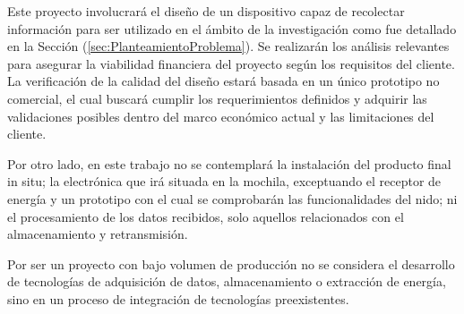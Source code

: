 Este proyecto involucrará el diseño de un dispositivo capaz de recolectar información para ser utilizado en el ámbito de la investigación como fue detallado en la Sección (\ref{sec:PlanteamientoProblema}). Se realizarán los análisis relevantes para asegurar la viabilidad financiera del proyecto según los requisitos del cliente. La verificación de la calidad del diseño estará basada en un único prototipo no comercial, el cual buscará cumplir los requerimientos definidos y adquirir las validaciones posibles dentro del marco económico actual y las limitaciones del cliente. 

Por otro lado, en este trabajo no se contemplará la instalación del producto final in situ; la electrónica que irá situada en la mochila, exceptuando el receptor de energía y un prototipo con el cual se comprobarán las funcionalidades del nido; ni el procesamiento de los datos recibidos, solo aquellos relacionados con el almacenamiento y retransmisión.

Por ser un proyecto con bajo volumen de producción no se considera el desarrollo de tecnologías de adquisición de datos, almacenamiento o extracción de energía, sino en un proceso de integración de tecnologías preexistentes.